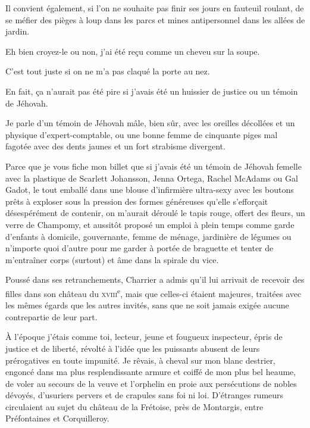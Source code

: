 Il convient également, si l’on ne souhaite pas finir ses jours en fauteuil roulant, de se méfier des pièges à loup dans les parcs et mines antipersonnel dans les allées de jardin.

Eh bien croyez-le ou non, j’ai été reçu comme un cheveu sur la soupe.

C’est tout juste si on ne m’a pas claqué la porte au nez.

\label{rat:50}%
En fait, ça n’aurait pas été pire si j’avais été un huissier de justice ou un témoin de Jéhovah.

Je parle d’un témoin de Jéhovah mâle, bien sûr, avec les oreilles décollées et un physique d’expert-comptable, ou une bonne femme de cinquante piges mal fagotée avec des dents jaunes et un fort strabisme divergent.

Parce que je vous fiche mon billet que si j’avais été un témoin de Jéhovah femelle avec la plastique de Scarlett Johansson, Jenna Ortega, Rachel McAdams ou Gal Gadot, le tout emballé dans une blouse d’infirmière ultra-sexy avec les boutons prêts à exploser sous la pression des formes généreuses qu’elle s’efforçait désespérément de contenir, on m’aurait déroulé le tapis rouge, offert des fleurs, un verre de Champomy, et aussitôt proposé un emploi à plein temps comme garde d’enfants à domicile, gouvernante, femme de ménage, jardinière de légumes ou n’importe quoi d’autre pour me garder à portée de braguette et tenter de m’entraîner corps (surtout) et âme dans la spirale du vice.

\label{rat:45}%
Poussé dans ses retranchements, Charrier a admis qu’il lui arrivait de recevoir des filles dans son château du \textsc{xviii}\textsuperscript{e}, mais que celles-ci étaient majeures, traitées avec les mêmes égards que les autres invités, sans que ne soit jamais exigée aucune contrepartie de leur part.

\label{rat:51}%
À l’époque j’étais comme toi, lecteur, jeune et fougueux inspecteur, épris de justice et de liberté, révolté à l’idée que les puissants abusent de leurs prérogatives en toute impunité. Je rêvais, à cheval sur mon blanc destrier, engoncé dans ma plus resplendissante armure et coiffé de mon plus bel heaume, de voler au secours de la veuve et l’orphelin en proie aux persécutions de nobles dévoyés, d’usuriers pervers et de crapules sans foi ni loi. D’étranges rumeurs circulaient au sujet du château de la Frétoise, près de Montargis, entre Préfontaines et Corquilleroy.

